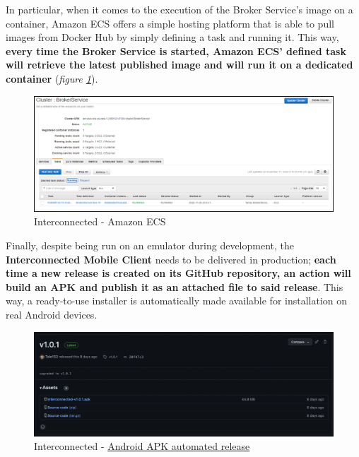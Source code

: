 In particular, when it comes to the execution of the Broker Service's image on a container, Amazon ECS offers a simple hosting platform that is able to pull images from Docker Hub by simply defining a task and running it. This way, \textbf{every time the Broker Service is started, Amazon ECS' defined task will retrieve the latest published image and will run it on a dedicated container} (\textit{figure \ref{fig:interconnected_ecs}}).

\begin{figure}[!ht]
    \centering
    \includegraphics[scale=0.37]{document/chapters/chapter_7/images/interconnected_ecs.png}
    \caption{Interconnected - Amazon ECS}
    \label{fig:interconnected_ecs}
\end{figure}

Finally, despite being run on an emulator during development, the \textbf{Interconnected Mobile Client} needs to be delivered in production; \textbf{each time a new release is created on its GitHub repository, an action will build an APK and publish it as an attached file to said release}. This way, a ready-to-use installer is automatically made available for installation on real Android devices.

\begin{figure}[!ht]
    \centering
    \includegraphics[scale=0.3]{document/chapters/chapter_7/images/github_actions_apk.png}
    \caption{Interconnected - \href{https://github.com/Interconnected-project/interconnected_mobile_client/releases}{Android APK automated release}}
    \label{fig:github_actions_apk}
\end{figure}